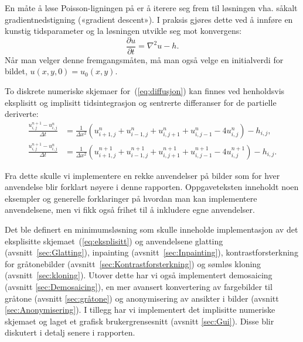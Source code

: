 En måte å løse Poisson-ligningen på er å iterere seg frem til løsningen vha. såkalt gradientnedstigning («gradient descent»). I praksis gjøres dette ved å innføre en kunstig tidsparameter og la løsningen utvikle seg mot konvergens:
\begin{equation}
\frac{\partial u}{\partial t} = \nabla^2 u - h.
\label{eq:diffusjon}
\end{equation}
Når man velger denne fremgangsmåten, må man også velge en initialverdi for bildet, $u(x, y, 0) = u_0(x, y)$.

To diskrete numeriske skjemaer for~(\ref{eq:diffusjon}) kan finnes ved henholdsvis eksplisitt og implisitt tidsintegrasjon og sentrerte differanser for de partielle deriverte:
\begin{align}
  \frac{u^{n+1}_{i,j} - u^n_{i,j}}{\Delta t} &= \frac{1}{\Delta x^2}
                                               (u^n_{i+1,j} +
                                               u^n_{i-1,j} +
                                               u^n_{i,j+1} +
                                               u^n_{i,j-1} -4 
                                               u^n_{i,j}) - h_{i,j},
                                               \label{eq:eksplisitt}  \\
  \frac{u^{n+1}_{i,j} - u^n_{i,j}}{\Delta t} &= \frac{1}{\Delta x^2}
                                               (u^{n+1}_{i+1,j} +
                                               u^{n+1}_{i-1,j} +
                                               u^{n+1}_{i,j+1} +
                                               u^{n+1}_{i,j-1} -4 
                                               u^{n+1}_{i,j}) - h_{i,j}.
                                               \label{eq:implisitt}
\end{align}

Fra dette skulle vi implementere en rekke anvendelser på bilder som for hver anvendelse blir forklart nøyere i denne rapporten. Oppgaveteksten inneholdt noen eksempler og generelle forklaringer på hvordan man kan implementere anvendelsene, men vi fikk også frihet til å inkludere egne anvendelser.

Det ble definert en minimumsløsning som skulle inneholde implementasjon av det eksplisitte skjemaet~(\ref{eq:eksplisitt}) og anvendelsene glatting (avsnitt~\ref{sec:Glatting}), inpainting (avsnitt~\ref{sec:Inpainting}), kontrastforsterkning for gråtonebilder (avsnitt~\ref{sec:Kontrastforsterkning}) og sømløs kloning (avsnitt~\ref{sec:kloning}). Utover dette har vi også implementert demosaicing (avsnitt \ref{sec:Demosaicing}), en mer avansert konvertering av fargebilder til gråtone (avsnitt \ref{sec:gråtone}) og anonymisering av ansikter i bilder (avsnitt \ref{sec:Anonymisering}). I tillegg har vi implementert det implisitte numeriske skjemaet og laget et grafisk brukergrensesnitt (avsnitt \ref{sec:Gui}). Disse blir diskutert i detalj senere i rapporten. 

